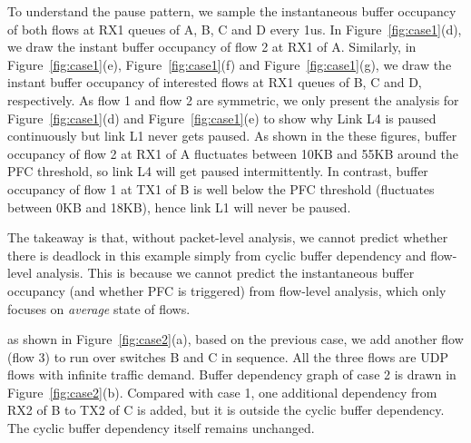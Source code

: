 To understand the pause pattern, we sample the instantaneous buffer occupancy of 
both flows at RX1 queues of A, B, C and D every 1us. In Figure~\ref{fig:case1}(d), we draw the instant 
buffer occupancy of flow 2 at RX1 of A. 
Similarly, in Figure~\ref{fig:case1}(e), Figure~\ref{fig:case1}(f) and Figure~\ref{fig:case1}(g), we draw 
the instant buffer occupancy of interested flows at RX1 queues of B, C and D, respectively. As 
flow 1 and flow 2 are symmetric, we only present the analysis for Figure~\ref{fig:case1}(d) and 
Figure~\ref{fig:case1}(e) to show why Link L4 is paused continuously but link L1 never gets paused.
As shown in the these figures, buffer occupancy of flow 2 at RX1 of A fluctuates between 10KB 
and 55KB around the PFC threshold, so link L4 will get paused intermittently. In contrast, buffer 
occupancy of flow 1 at TX1 of B is well below the PFC threshold (fluctuates between 0KB and 18KB), 
hence link L1 will never be paused. 

The takeaway is that, without packet-level analysis, we cannot predict whether there is deadlock in this example
simply from cyclic buffer dependency and flow-level analysis. This is because we cannot predict 
the instantaneous buffer occupancy (and whether PFC is triggered) from flow-level analysis, 
which only focuses on {\em average} state of flows.

%
%



 as shown in Figure~\ref{fig:case2}(a), based on the previous case, we 
add another flow (flow 3) to run over switches B and C in sequence. All the three flows are UDP 
flows with infinite traffic demand. Buffer dependency graph of case 2 is drawn in Figure~\ref{fig:case2}(b). 
Compared with case 1, one additional dependency from RX2 of B to TX2 of C is added, but it
is outside the cyclic buffer dependency. The cyclic buffer dependency itself remains unchanged.

